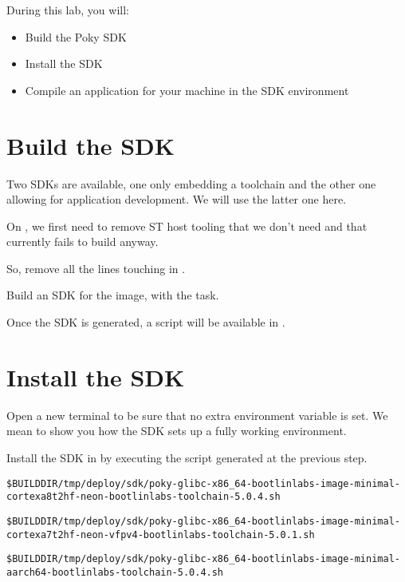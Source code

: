 
During this lab, you will:
\begin{itemize}
  \item Build the Poky SDK
  \item Install the SDK
  \item Compile an application for your machine in the SDK
    environment
\end{itemize}

\section{Build the SDK}

Two SDKs are available, one only embedding a toolchain and the
other one allowing for application development. We will use the latter one
here.

\if{}
On , we first need to remove ST host tooling that we
don't need and that currently fails to build anyway.

So, remove all the lines touching  in
.
\fi

Build an SDK for the  image, with
the  task.

Once the SDK is generated, a script will be available in
.

\section{Install the SDK}

Open a new terminal to be sure that no extra environment variable is set.
We mean to show you how the SDK sets up a fully working environment.

Install the SDK in  by executing the script
generated at the previous step.

{\footnotesize
\if{}
\begin{verbatim}
$BUILDDIR/tmp/deploy/sdk/poky-glibc-x86_64-bootlinlabs-image-minimal-cortexa8t2hf-neon-bootlinlabs-toolchain-5.0.4.sh
\end{verbatim}
\fi
\if{}
\begin{verbatim}
$BUILDDIR/tmp/deploy/sdk/poky-glibc-x86_64-bootlinlabs-image-minimal-cortexa7t2hf-neon-vfpv4-bootlinlabs-toolchain-5.0.1.sh
\end{verbatim}
\fi
\if{}
\begin{verbatim}
$BUILDDIR/tmp/deploy/sdk/poky-glibc-x86_64-bootlinlabs-image-minimal-aarch64-bootlinlabs-toolchain-5.0.4.sh
\end{verbatim}
\fi
}

